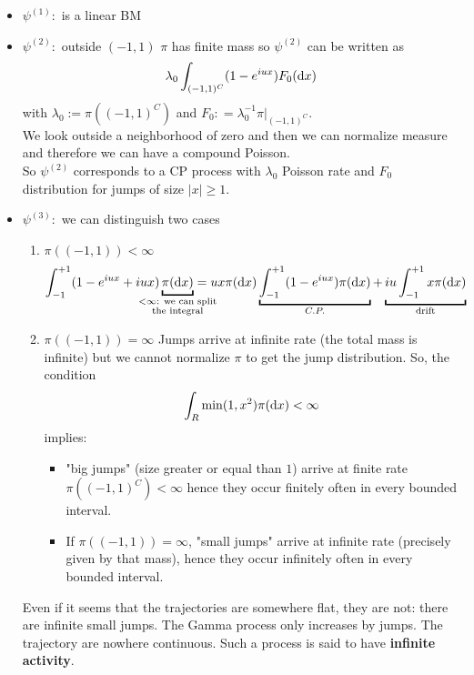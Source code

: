 \documentclass{article}
\begin{document}
	\begin{itemize}
		\item $\psi^{(1)}:$ is a linear BM
		\item $\psi^{(2)}:$ outside $(-1,1)$ $\pi$ has finite mass so $\psi^{(2)}$ can be written as
		\begin{equation*}
			\lambda_0 \int_{(-1,1)^C} (1-e^{iux}) F_0(\mathop{}\!\mathrm{d} x)
		\end{equation*}
		with $\lambda_0 := \pi((-1,1)^C)$ and $F_0 : = \lambda_0^{-1} \pi |_{(-1,1)^C}$.\\ 
		We look outside a neighborhood of zero and then we can normalize measure and therefore we can have a compound Poisson. \\
		So $\psi^{(2)}$ corresponds to a CP process with $\lambda_0$ Poisson rate and $F_0$ distribution for jumps of size $|x|\geq 1$.
		\item $\psi^{(3)}:$ we can distinguish two cases
		\begin{enumerate}
			\item $\pi((-1,1)) < \infty$
			\begin{equation*}
				\int_{-1}^{+1}(1-e^{iux} + iux)\underbracket{\pi(\dif x)}_{\mathclap{\substack{<\infty\text{: we can split}\\ \text{the integral}}}} = u x \pi(\dif x)\underbracket{\int_{-1}^{+1}(1-e^{iux})\pi(\dif x)}_{C.P.} + \underbracket{iu \int_{-1}^{+1} x \pi(\dif x)}_{\text{drift}}
			\end{equation*}
			\item $\pi((-1,1)) = \infty$
			Jumps arrive at infinite rate (the total mass is infinite) but we cannot normalize $\pi$ to get the jump distribution. 
			So, the condition 
			\begin{equation*}
				\int_R \min(1,x^2) \pi(\mathop{}\!\mathrm{d} x)<\infty
			\end{equation*}
			implies:
			\begin{itemize}
				\item "big jumps" (size greater or equal than $1$) arrive at finite rate $\pi((-1,1)^C) < \infty$ hence they occur finitely often in every bounded interval. 
				\item If $\pi((-1,1)) = \infty$, "small jumps" arrive at infinite rate (precisely given by that mass), hence they occur infinitely often in every bounded interval. 
			\end{itemize}
		\end{enumerate}
		Even if it seems that the trajectories are somewhere flat, they are not: there are infinite small jumps. The Gamma process only increases by jumps. The trajectory are nowhere continuous. Such a process is said to have \textbf{infinite activity}.  
	\end{itemize} 
\end{document}
